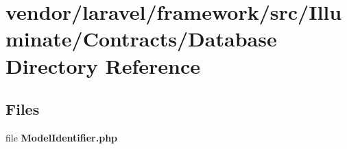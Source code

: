 \section{vendor/laravel/framework/src/\+Illuminate/\+Contracts/\+Database Directory Reference}
\label{dir_a155d8d715b5a4f23b3ec7400347b715}
\subsection*{Files}
\begin{DoxyCompactItemize}
\item 
file {\bf Model\+Identifier.\+php}
\end{DoxyCompactItemize}

